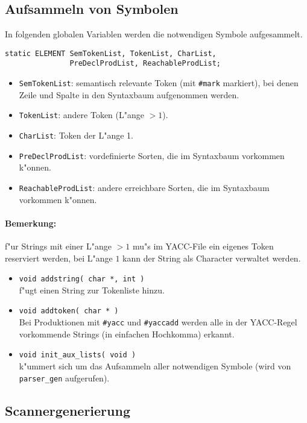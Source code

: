 \subsection{Aufsammeln von Symbolen}

In folgenden globalen Variablen werden die notwendigen Symbole aufgesammelt.
\begin{verbatim}
static ELEMENT SemTokenList, TokenList, CharList,
               PreDeclProdList, ReachableProdList;
\end{verbatim}

\begin{itemize}
\item {\tt SemTokenList}: semantisch relevante Token (mit {\tt \#mark} markiert),
bei denen Zeile und Spalte in den Syntaxbaum aufgenommen werden.
\item {\tt TokenList}: andere Token (L"ange $>1$).
\item {\tt CharList}: Token der L"ange 1.
\item {\tt PreDeclProdList}: vordefinierte Sorten, die im Syntaxbaum vorkommen k"onnen.
\item {\tt ReachableProdList}: andere erreichbare Sorten, die im Syntaxbaum vorkommen k"onnen.
\end{itemize}

\paragraph{Bemerkung:}
f"ur Strings mit einer L"ange $>1$ mu"s im YACC-File ein eigenes
Token reserviert werden, bei L"ange $1$ kann der String als Character
verwaltet werden.

\begin{itemize}
\item {\tt void addstring( char *, int )}\\
f"ugt einen String zur Tokenliste hinzu.

\item {\tt void addtoken( char * )}\\
Bei Produktionen mit {\tt \#yacc} und {\tt \#yaccadd} werden alle in
der YACC-Regel vorkommende Strings (in einfachen Hochkomma) erkannt.

\item {\tt void init\_aux\_lists( void )}\\
k"ummert sich um das Aufsammeln aller notwendigen Symbole (wird von
{\tt parser\_gen} aufgerufen).
\end{itemize}

\subsection{Scannergenerierung}


